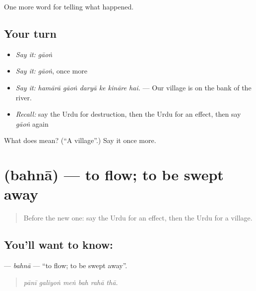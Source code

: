 \begin{grammarlens}[title={What you've built}]
One more word for telling what happened.
\end{grammarlens}

\subsection*{Your turn}
\begin{itemize}
\raggedright
  \item \emph{Say it:} \emph{gāoṅ}
  \item \emph{Say it:} \emph{gāoṅ}, once more
  \item \emph{Say it:} \emph{hamārā gāoṅ daryā ke kināre hai.} — Our village is on the bank of the river.
  \item \emph{Recall:} say the Urdu for destruction, then the Urdu for an effect, then say \emph{gāoṅ} again
\end{itemize}

\begin{tcolorbox}[breakable,colback=teal!4,colframe=teal!35!black,title={Before you move on}]
What does  mean? (\textquotedblleft{}A village\textquotedblright{}.) Say it once more.
\end{tcolorbox}
\section[\texorpdfstring{\ur{بہنا} (bahnā)}{بہنا (bahnā)}]{ (bahnā) — to flow; to be swept away}

\label{lesson:UR-C293-bahna}



\begin{quote}
Before the new one: say the Urdu for an effect, then the Urdu for a village.
\end{quote}

\subsection*{You'll want to know: }
\textbf{} — \emph{bahnā} — \textquotedblleft{}to flow; to be swept away\textquotedblright{}.

\begin{quote}
     
\end{quote}

\begin{quote}
\emph{pānī galiyoṅ meṅ bah rahā thā.}
\end{quote}

